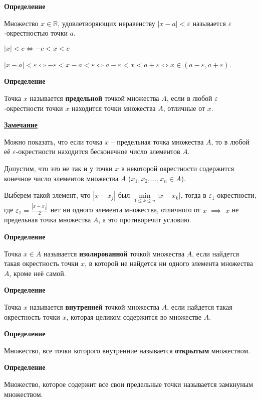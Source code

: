 \documentclass{article}
\begin{document}
\textbf{Определение}

Множество $x \in \mathbb{R}$, удовлетворяющих неравенству $|x - a| < \varepsilon$
называется $\varepsilon$-окрестностью точки $a$.

$|x| < c \Leftrightarrow -c < x < c$

$|x - a| < \varepsilon \Leftrightarrow -\varepsilon < x - a < \varepsilon \Leftrightarrow
a - \varepsilon < x < a + \varepsilon \Leftrightarrow x \in (a - \varepsilon, a + \varepsilon)$.

\textbf{Определение}

Точка $x$ называется \textbf{предельной} точкой множества $A$, если в любой $\varepsilon$-окрестности
точки $x$ находится точки множества $A$, отличные от $x$.

\underline{\textbf{Замечание}}

Можно показать, что если точка $x$ -- предельная точка множества $A$, то в любой её
$\varepsilon$-окрестности находится бесконечное число элементов $A$.

Допустим, что это не так и у точки $x$ в некоторой окрестности содержится конечное
число элементов множества $A$ ($x_1,x_2,\dots,x_n \in A$).

Выберем такой элемент, что $|x - x_j|$ был $\underset{1 \le k \le n}{\min} |x - x_k|$,
тогда в $\varepsilon_1$-окрестности, где $\varepsilon_1 = \frac{|x - x_j|}{2}$ нет ни
одного элемента множества, отличного от $x$ $\implies$ $x$ не предельная точка множества
$A$, а это противоречит условию.

\textbf{Определение}

Точка $x \in A$ называется \textbf{изолированной} точкой множества $A$, если найдется такая
окрестность точки $x$, в которой не найдется ни одного элемента множества $A$,
кроме неё самой.

\textbf{Определение}

Точка $x$ называется \textbf{внутренней} точкой множества $A$, если найдется такая
окрестность точки $x$, которая целиком содержится во множестве $A$.

\textbf{Определение}

Множество, все точки которого внутренние называется \textbf{открытым} множеством.

\textbf{Определение}

Множество, которое содержит все свои предельные точки называется замкнуным множеством.
\end{document}
